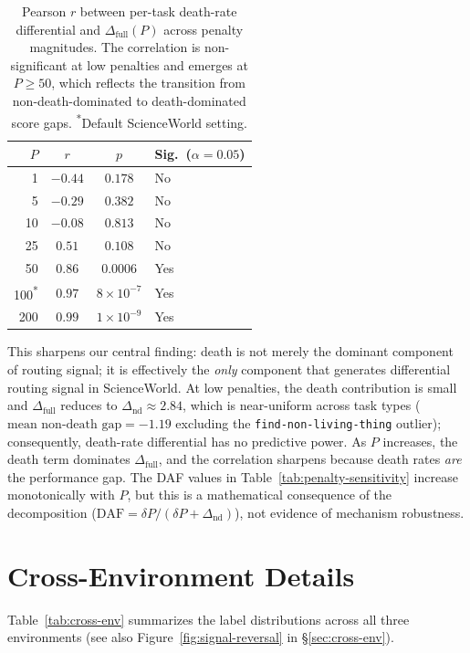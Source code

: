\documentclass[11pt]{article}
\begin{document}
\begin{table}[h]
\centering
\small
\begin{tabular}{@{}rccl@{}}
\toprule
$P$ & $r$ & $p$ & Sig.\ ($\alpha{=}0.05$) \\
\midrule
1 & $-0.44$ & $0.178$ & No \\
5 & $-0.29$ & $0.382$ & No \\
10 & $-0.08$ & $0.813$ & No \\
25 & $0.51$ & $0.108$ & No \\
50 & $0.86$ & $0.0006$ & Yes \\
100\textsuperscript{*} & $0.97$ & $8 \times 10^{-7}$ & Yes \\
200 & $0.99$ & $1 \times 10^{-9}$ & Yes \\
\bottomrule
\end{tabular}
\caption{Pearson $r$ between per-task death-rate differential and $\Delta_{\text{full}}(P)$ across penalty magnitudes. The correlation is non-significant at low penalties and emerges at $P \geq 50$, which reflects the transition from non-death-dominated to death-dominated score gaps. \textsuperscript{*}Default ScienceWorld setting.}
\label{tab:penalty-correlation}
\end{table}

This sharpens our central finding: death is not merely the dominant component of routing signal; it is effectively the \emph{only} component that generates differential routing signal in ScienceWorld. At low penalties, the death contribution is small and $\Delta_{\text{full}}$ reduces to $\Delta_{\text{nd}} \approx 2.84$, which is near-uniform across task types ($\text{mean non-death gap} = -1.19$ excluding the \texttt{find-non-living-thing} outlier); consequently, death-rate differential has no predictive power. As $P$ increases, the death term dominates $\Delta_{\text{full}}$, and the correlation sharpens because death rates \emph{are} the performance gap. The DAF values in Table~\ref{tab:penalty-sensitivity} increase monotonically with $P$, but this is a mathematical consequence of the decomposition ($\text{DAF} = \delta P / (\delta P + \Delta_{\text{nd}})$), not evidence of mechanism robustness.

\section{Cross-Environment Details}
\label{app:cross-env-details}

Table~\ref{tab:cross-env} summarizes the label distributions across all three environments (see also Figure~\ref{fig:signal-reversal} in \S\ref{sec:cross-env}).
\end{document}
